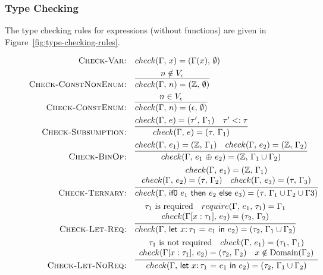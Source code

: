 \documentclass[10pt,conference]{IEEEtran}
\newcommand{\Z}{\ensuremath{\mathbb{Z}}}
\newcommand{\lett}[4]{\ensuremath{\mathsf{let}\ #1\mathsf{:}\,#2\ \mathsf{=}\ #3\ \mathsf{in}\ #4}}
\newcommand{\binop}[2]{\ensuremath{#1\ \mathsf{\oplus}\ #2}}
\newcommand{\ternary}[3]{\ensuremath{\mathsf{if0}\ #1\ \mathsf{then}\ #2\ \mathsf{else}\ #3}}
\newcommand{\checktype}[4]{\ensuremath{{check}(#1,\,#2)=(#3,\,#4)}}
\newcommand{\requiretype}[4]{\ensuremath{{require}(#1,\,#2,\,#3)=#4}}
\newcommand{\required}[1]{\ensuremath{#1\text{ is required}}}
\newcommand{\nrequired}[1]{\ensuremath{#1\text{ is not required}}}
\begin{document}
\subsubsection{Type Checking}
The type checking rules for expressions (without functions) are given in Figure~\ref{fig:type-checking-rules}.

\begin{figure*}[ht]
\normalsize
\centering
\begin{framed}
\begin{align*}
\text{\textsc{Check-Var:}} &\quad \checktype{\Gamma}{x}{\Gamma(x)}{\emptyset} \\
\text{\textsc{Check-ConstNonEnum:}} &\quad \infer{\checktype{\Gamma}{n}{\Z}{\emptyset}}{n \notin V_\epsilon} \\
\text{\textsc{Check-ConstEnum:}} &\quad \infer{\checktype{\Gamma}{n}{\epsilon}{\emptyset}}{n \in V_\epsilon} \\
\text{\textsc{Check-Subsumption:}} &\quad \infer{\checktype{\Gamma}{e}{\tau}{\Gamma_1}}{\checktype{\Gamma}{e}{\tau'}{\Gamma_1} \quad \tau' <: \tau} \\
\text{\textsc{Check-BinOp:}} &\quad \infer{\checktype{\Gamma}{\binop{e_1}{e_2}}{\Z}{\Gamma_1 \cup \Gamma_2}}{\checktype{\Gamma}{e_1}{\Z}{\Gamma_1} \quad \checktype{\Gamma}{e_2}{\Z}{\Gamma_2}} \\
\text{\textsc{Check-Ternary:}} &\quad \infer{\checktype{\Gamma}{\ternary{e_1}{e_2}{e_3}}{\tau}{\Gamma_1 \cup \Gamma_2 \cup \Gamma 3}}{
\begin{array}{c}
\checktype{\Gamma}{e_1}{\Z}{\Gamma_1} \\
\checktype{\Gamma}{e_2}{\tau}{\Gamma_2} \quad \checktype{\Gamma}{e_3}{\tau}{\Gamma_3}
\end{array}
} \\
\text{\textsc{Check-Let-Req:}} &\quad \infer{\checktype{\Gamma}{\lett{x}{\tau_1}{e_1}{e_2}}{\tau_2}{\Gamma_1 \cup \Gamma_2}}{
\begin{array}{c}
\required{\tau_1} \quad \requiretype{\Gamma}{e_1}{\tau_1}{\Gamma_1} \\
\checktype{\Gamma[x:\tau_1]}{e_2}{\tau_2}{\Gamma_2}
\end{array}
} \\
\text{\textsc{Check-Let-NoReq:}} &\quad \infer{\checktype{\Gamma}{\lett{x}{\tau_1}{e_1}{e_2}}{\tau_2}{\Gamma_1 \cup \Gamma_2}}{
\begin{array}{c}
\nrequired{\tau_1} \quad \checktype{\Gamma}{e_1}{\tau_1}{\Gamma_1} \\
\checktype{\Gamma[x:\tau_1]}{e_2}{\tau_2}{\Gamma_2} \quad x \notin \text{Domain}(\Gamma_2)

\end{array}}
\end{align*}
\end{framed}
\end{figure*}
\end{document}
